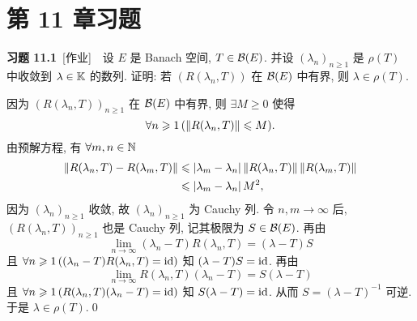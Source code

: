 \section{第 11 章习题}
    \textbf{习题 11.1}\ [作业]\ \ 设 $ E $ 是 Banach 空间, $ T\in\mathcal{B}(E) $. 并设 $ (\lambda_{n})_{n\geqslant1} $ 是 $ \rho(T) $ 中收敛到 $ \lambda\in\mathbb{K} $ 的数列. 证明: 若 $ (R(\lambda_{n}, T)) $ 在 $ \mathcal{B}(E) $ 中有界, 则 $ \lambda\in\rho(T) $.
    \begin{Proof}
        因为 $ (R(\lambda_{n}, T))_{n\geqslant1} $ 在 $ \mathcal{B}(E) $ 中有界, 则 $ \exists M\geqslant0 $ 使得
        \[
            \forall n\geqslant1\,(\left\| R(\lambda_{n}, T) \right\|\leqslant M).
        \]
        由预解方程, 有 $ \forall m, n\in\mathbb{N} $
        \[
            \begin{aligned}
                \left\| R(\lambda_{n}, T)-R(\lambda_{m}, T) \right\| & \leqslant \left| \lambda_{m}-\lambda_{n} \right| \left\| R(\lambda_{n}, T) \right\|\left\| R(\lambda_{m}, T) \right\|\\
                & \leqslant\left| \lambda_{m}-\lambda_{n} \right| M^{2},
            \end{aligned}
        \]
        因为 $ (\lambda_{n})_{n\geqslant1} $ 收敛, 故 $ (\lambda_{n})_{n\geqslant1} $ 为 Cauchy 列. 令 $ n, m\to\infty $ 后, $ (R(\lambda_{n}, T))_{n\geqslant1} $ 也是 Cauchy 列, 记其极限为 $ S\in\mathcal{B}(E) $. 再由
        \[
            \lim_{n\to\infty}(\lambda_{n}-T)R(\lambda_{n}, T)=(\lambda-T)S
        \]
        且 $ \forall n\geqslant1\,((\lambda_{n}-T)R(\lambda_{n}, T)=\mathrm{id}) $ 知 $ (\lambda-T)S=\mathrm{id} $. 再由
        \[
            \lim_{n\to\infty} R(\lambda_{n}, T)(\lambda_{n}-T)=S(\lambda-T)
        \]
        且 $ \forall n\geqslant1\,(R(\lambda_{n}, T)(\lambda_{n}-T)=\mathrm{id}) $ 知 $ S(\lambda-T)=\mathrm{id} $. 从而 $ S=(\lambda-T)^{-1} $ 可逆. 于是 $ \lambda\in\rho(T) $.\qed
    \end{Proof}

